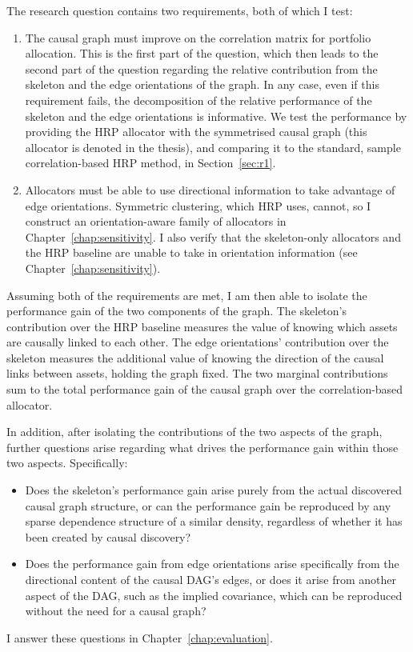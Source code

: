 The research question contains two requirements, both of which I test:
\begin{enumerate}[itemsep=1pt, topsep=3pt]
    \item The causal graph must improve on the correlation matrix
    for portfolio allocation. This is the first part of the question,
    which then leads to the second part of the question regarding the
    relative contribution from the skeleton and the edge orientations
    of the graph. In any case, even if this requirement fails, the
    decomposition of the relative performance of the skeleton and
    the edge orientations is informative. We test the performance
    by providing the HRP allocator with the symmetrised causal graph
    (this allocator is denoted \skelsamp{} in the thesis), and 
    comparing it to the standard, sample correlation-based HRP method,
    in Section~\ref{sec:r1}.
    \item Allocators must be able to use directional information
    to take advantage of edge orientations. Symmetric clustering,
    which HRP uses, cannot, so I construct an orientation-aware
    family of allocators in Chapter~\ref{chap:sensitivity}.
    I also verify that the skeleton-only allocators and the
    HRP baseline are unable to take in orientation information 
    (see Chapter~\ref{chap:sensitivity}).
\end{enumerate}

\noindent Assuming both of the requirements are met, I am then able
to isolate the performance gain of the two components of the graph.
The skeleton's contribution over the HRP baseline measures the
value of knowing which assets are causally linked to each other. 
The edge orientations' contribution over the skeleton measures
the additional value of knowing the direction of the causal links
between assets, holding the graph fixed. The two marginal
contributions sum to the total performance gain of the causal
graph over the correlation-based allocator. 

In addition, after isolating the contributions of the two 
aspects of the graph, further questions arise regarding what drives the
performance gain within those two aspects. Specifically:
\begin{itemize}
    \item Does the skeleton's performance gain arise purely from the 
    actual discovered causal graph structure, or can the performance gain
    be reproduced by any sparse dependence structure of a similar density,
    regardless of whether it has been created by causal discovery?
    \item Does the performance gain from edge orientations
    arise specifically from the directional content of the causal DAG's
    edges, or does it arise from another aspect of the DAG, such as the
    implied covariance, which can be reproduced without the need for
    a causal graph?
\end{itemize}
\noindent I answer these questions in Chapter~\ref{chap:evaluation}.

